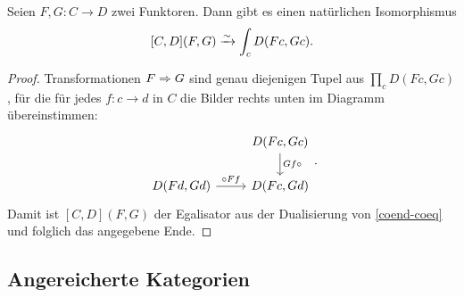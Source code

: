 \begin{lemma}
  \label{trans-end}
  Seien $F, G: C \to D$ zwei Funktoren. Dann gibt es einen natürlichen
  Isomorphismus
  \[ [C, D](F, G) \xrightarrow[]{\sim} \int_c D(Fc, Gc). \]
\end{lemma}
\begin{proof}
  Transformationen $F \Rightarrow G$ sind genau diejenigen Tupel aus
  $\prod_c D(Fc, Gc)$, für die für jedes $f: c \to d$ in $C$ die
  Bilder rechts unten im Diagramm übereinstimmen:
  \[ \begin{tikzcd}
    & D(Fc, Gc) \arrow{d}{Gf \circ} \\
    D(Fd, Gd) \arrow{r}{\circ Ff} & D(Fc, Gd)
  \end{tikzcd}. \]
  Damit ist $[C, D](F, G)$ der Egalisator aus der Dualisierung von
  \ref{coend-coeq} und folglich das angegebene Ende.
\end{proof}

\subsection{Angereicherte Kategorien}

